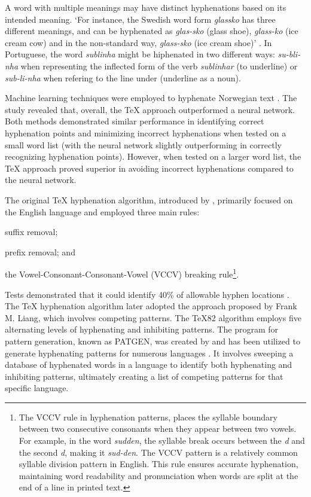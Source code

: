 A word with multiple meanings may have distinct hyphenations based on its intended meaning.
`For instance, the Swedish word form \emph{glassko} has three different
meanings, and can be hyphenated as \emph{glas-sko} (glass shoe),
\emph{glass-ko} (ice cream cow) and in the non-standard way,
\emph{glass-sko} (ice cream shoe)' \parencite{nemeth2006}. In Portuguese, the
word \emph{sublinha} might be hiphenated in two different ways:
\emph{su-bli-nha} when representing the inflected form of the verb
\emph{sublinhar} (to underline) or \emph{sub-li-nha} when refering
to the line under (underline as a noun).


Machine learning techniques were employed to hyphenate Norwegian text
\parencite{kristensen2001}. The study revealed that, overall, the \TeX{} approach
outperformed a neural network.  Both methods demonstrated similar performance
in identifying correct hyphenation points and minimizing incorrect hyphenations
when tested on a small word list (with the neural network slightly
outperforming in correctly recognizing hyphenation points).  However, when
tested on a larger word list, the \TeX{} approach proved superior in avoiding
incorrect hyphenations compared to the neural network.


The original \TeX{} hyphenation algorithm, introduced by %
\textcite{knuth1977}, primarily focused on the English language and employed three
main rules:
\begin{enumerate*}[label=(\arabic*)]
 \item suffix removal; 
 \item prefix removal; and 
 \item the Vowel-Consonant-Consonant-Vowel (VCCV) breaking rule\footnote{The 
     VCCV rule in hyphenation patterns, places the syllable boundary between 
     two consecutive consonants when they appear between two vowels. For example, 
     in the word \emph{sudden}, the syllable break occurs between the \emph{d} and 
     the second \emph{d}, making it \emph{sud-den}. 
     The VCCV pattern is a relatively common syllable division pattern in English.
     This rule ensures accurate 
     hyphenation, maintaining word readability and pronunciation when words are 
     split at the end of a line in printed text.}. 
\end{enumerate*}
Tests demonstrated that it could identify 40\% of allowable hyphen locations
\parencite{liang1983}.  The \TeX{} hyphenation algorithm later adopted the approach
proposed by Frank M. Liang, which involves competing patterns.  The \TeX{}82
algorithm employs five alternating levels of hyphenating and inhibiting
patterns. The program for pattern generation, known as PATGEN, was created by
\parencite{liangbreitenlohner1999} and has been utilized to generate
hyphenating patterns for numerous languages
\parencite{sojka1995,sojka1995a,sojka2005thesis,sojka2003,scannell2003}. It involves
sweeping a database of hyphenated words in a language to identify both
hyphenating and inhibiting patterns, ultimately creating a list of competing
patterns for that specific language.

